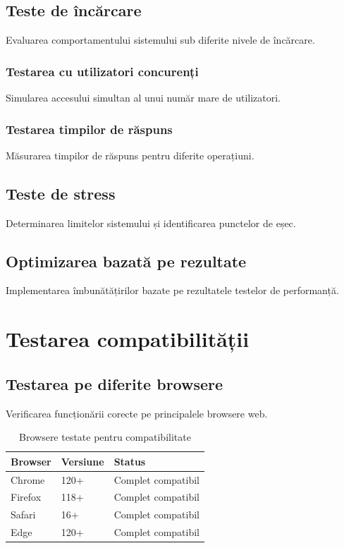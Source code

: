 \documentclass[12pt,a4paper]{report}
\begin{document}
\subsection{Teste de încărcare}

Evaluarea comportamentului sistemului sub diferite nivele de încărcare.

\subsubsection{Testarea cu utilizatori concurenți}

Simularea accesului simultan al unui număr mare de utilizatori.

\subsubsection{Testarea timpilor de răspuns}

Măsurarea timpilor de răspuns pentru diferite operațiuni.

\subsection{Teste de stress}

Determinarea limitelor sistemului și identificarea punctelor de eșec.

\subsection{Optimizarea bazată pe rezultate}

Implementarea îmbunătățirilor bazate pe rezultatele testelor de performanță.

\section{Testarea compatibilității}

\subsection{Testarea pe diferite browsere}

Verificarea funcționării corecte pe principalele browsere web.

\begin{table}[H]
\centering
\caption{Browsere testate pentru compatibilitate}
\label{tab:browser_compatibility}
\begin{tabular}{|l|l|l|}
\hline
\textbf{Browser} & \textbf{Versiune} & \textbf{Status} \\
\hline
Chrome & 120+ & Complet compatibil \\
\hline
Firefox & 118+ & Complet compatibil \\
\hline
Safari & 16+ & Complet compatibil \\
\hline
Edge & 120+ & Complet compatibil \\
\hline
\end{tabular}
\end{table}
\end{document}
